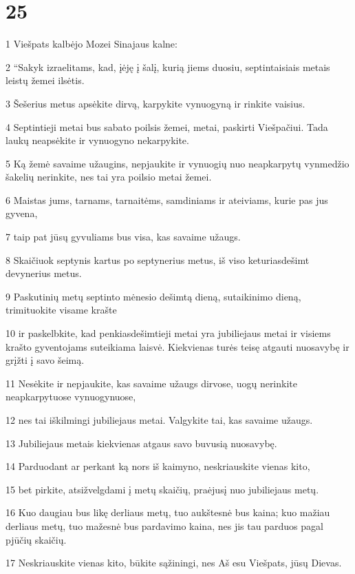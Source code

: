 \chapter{25}

\par 1 Viešpats kalbėjo Mozei Sinajaus kalne: 
\par 2 “Sakyk izraelitams, kad, įėję į šalį, kurią jiems duosiu, septintaisiais metais leistų žemei ilsėtis. 
\par 3 Šešerius metus apsėkite dirvą, karpykite vynuogyną ir rinkite vaisius. 
\par 4 Septintieji metai bus sabato poilsis žemei, metai, paskirti Viešpačiui. Tada laukų neapsėkite ir vynuogyno nekarpykite. 
\par 5 Ką žemė savaime užaugins, nepjaukite ir vynuogių nuo neapkarpytų vynmedžio šakelių nerinkite, nes tai yra poilsio metai žemei. 
\par 6 Maistas jums, tarnams, tarnaitėms, samdiniams ir ateiviams, kurie pas jus gyvena, 
\par 7 taip pat jūsų gyvuliams bus visa, kas savaime užaugs. 
\par 8 Skaičiuok septynis kartus po septynerius metus, iš viso keturiasdešimt devynerius metus. 
\par 9 Paskutinių metų septinto mėnesio dešimtą dieną, sutaikinimo dieną, trimituokite visame krašte 
\par 10 ir paskelbkite, kad penkiasdešimtieji metai yra jubiliejaus metai ir visiems krašto gyventojams suteikiama laisvė. Kiekvienas turės teisę atgauti nuosavybę ir grįžti į savo šeimą. 
\par 11 Nesėkite ir nepjaukite, kas savaime užaugs dirvose, uogų nerinkite neapkarpytuose vynuogynuose, 
\par 12 nes tai iškilmingi jubiliejaus metai. Valgykite tai, kas savaime užaugs. 
\par 13 Jubiliejaus metais kiekvienas atgaus savo buvusią nuosavybę. 
\par 14 Parduodant ar perkant ką nors iš kaimyno, neskriauskite vienas kito, 
\par 15 bet pirkite, atsižvelgdami į metų skaičių, praėjusį nuo jubiliejaus metų. 
\par 16 Kuo daugiau bus likę derliaus metų, tuo aukštesnė bus kaina; kuo mažiau derliaus metų, tuo mažesnė bus pardavimo kaina, nes jis tau parduos pagal pjūčių skaičių. 
\par 17 Neskriauskite vienas kito, būkite sąžiningi, nes Aš esu Viešpats, jūsų Dievas. 
